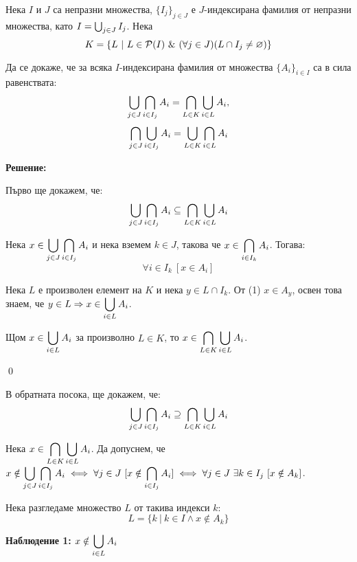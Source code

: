 \begin{problem}
Нека $I$ и $J$ са непразни множества, $\{I_j\}_{j \in J}$ е $J$-индексирана фамилия от непразни множества,
като $I = \bigcup_{j \in J} I_j$. Нека
\[
K = \{L\ |\ L \in \pow(I) \land (\forall j \in J) (L \cap I_j \neq \varnothing)\}
\]

Да се докаже, че за всяка $I$-индексирана фамилия от множества $\{A_i\}_{i \in I}$ са в сила равенствата:
\[
\bigcup_{j \in J} \bigcap_{i \in I_j} A_i = \bigcap_{L \in K} \bigcup_{i \in L} A_i,
\]
\[
\bigcap_{j \in J} \bigcup_{i \in I_j} A_i = \bigcup_{L \in K} \bigcap_{i \in L} A_i
\]

\textbf{Решение:}
\smallbreak

\quad
Първо ще докажем, че:
\[
\bigcup_{j \in J} \bigcap_{i \in I_j} A_i \subseteq \bigcap_{L \in K} \bigcup_{i \in L} A_i
\]

\begin{tcolorbox}[mybox={Доказателство:}]
\quad
Нека \(\displaystyle x \in \bigcup_{j \in J} \bigcap_{i \in I_j} A_i\) и нека
вземем $k \in J$, такова че $\displaystyle x \in \bigcap_{i \in I_k} A_i$. Тогава:
\begin{equation}
\forall i \in I_k\ [x \in A_i]
\end{equation}

\quad
Нека $L$ е произволен елемент на $K$ и нека $y \in L \cap I_k$.
От (1) $x \in A_y$, освен това знаем, че $\displaystyle y \in L \Rightarrow x \in \bigcup_{i \in L} A_i$.

\quad
Щом $\displaystyle x \in \bigcup_{i \in L} A_i$ за произволно $L \in K$,
то $\displaystyle x \in \bigcap_{L \in K} \bigcup_{i \in L} A_i$.

\qed
\end{tcolorbox}

\bigbreak
\quad
В обратната посока, ще докажем, че:
\[
\bigcup_{j \in J} \bigcap_{i \in I_j} A_i \supseteq \bigcap_{L \in K} \bigcup_{i \in L} A_i
\]
\begin{tcolorbox}[mybox={Доказателство:}]
\quad
Нека \(\displaystyle x \in \bigcap_{L \in K} \bigcup_{i \in L} A_i\).
Да допуснем, че
$\displaystyle x \notin \bigcup_{j \in J} \bigcap_{i \in I_j} A_i \iff
\forall j \in J\ [x \notin \bigcap_{i \in I_j} A_i] \iff
\forall j \in J\ \exists k \in I_j \ [x \notin A_k]$.

\quad
Нека разгледаме множество $L$ от такива индекси $k$:
\[
L = \{k \ |\ k \in I \land x \notin A_k\}
\]

\quad
\textbf{Наблюдение 1:} $\displaystyle x \notin \bigcup_{i \in L} A_i$


\end{tcolorbox}
\end{problem}
